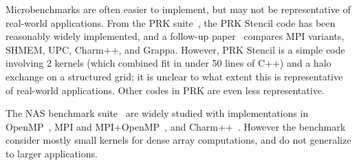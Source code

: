 Microbenchmarks are often easier to implement, but may not be
representative of real-world applications. From the PRK
suite~\cite{PRK14}, the PRK Stencil code has been reasonably widely
implemented, and a follow-up paper~\cite{PRKRuntimes16} compares MPI
variants, SHMEM, UPC, Charm++, and Grappa. However, PRK Stencil is a
simple code involving 2 kernels (which combined fit in under 50 lines
of C++) and a halo exchange on a structured grid; it is unclear to
what extent this is representative of real-world applications. Other
codes in PRK are even less representative.

The NAS benchmark suite~\cite{NAS91, NAS95} are widely studied with
implementations in OpenMP~\cite{NASOpenMP99}, MPI and
MPI+OpenMP~\cite{NASMPIOpenMP00}, and
Charm++~\cite{NASCharm96}. However the benchmark consider mostly small
kernels for dense array computations, and do not generalize to larger
applications.



